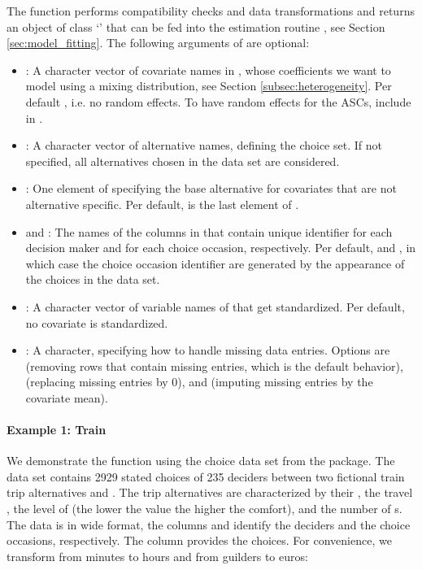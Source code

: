 \documentclass[article]{jss}
\newcommand{\class}[1]{`\code{#1}'}
\newcommand{\fct}[1]{\code{#1()}}
\begin{document}
The function performs compatibility checks and data transformations and returns an object of class \class{RprobitB\_data} that can be fed into the estimation routine \fct{fit\_model}, see Section \ref{sec:model_fitting}. The following arguments of \fct{prepare\_data} are optional:
\begin{itemize}
  \item {}: A character vector of covariate names in , whose coefficients we want to model using a mixing distribution, see Section \ref{subsec:heterogeneity}. Per default , i.e. no random effects. To have random effects for the ASCs, include  in .
  \item {}: A character vector of alternative names, defining the choice set. If not specified, all alternatives chosen in the data set are considered.
  \item {}: One element of  specifying the base alternative for covariates that are not alternative specific. Per default,  is the last element of .
  \item {} and : The names of the columns in  that contain unique identifier for each decision maker and for each choice occasion, respectively. Per default,  and , in which case the choice occasion identifier are generated by the appearance of the choices in the data set.
  \item {}: A character vector of variable names of  that get standardized. Per default, no covariate is standardized.
  \item {}: A character, specifying how to handle missing data entries. Options are  (removing rows that contain missing entries, which is the default behavior),  (replacing missing entries by 0), and  (imputing missing entries by the covariate mean).
\end{itemize}

\paragraph{Example 1: Train}

We demonstrate the \fct{prepare\_data} function using the choice data set  from the  package. The data set contains 2929 stated choices of 235 deciders between two fictional train trip alternatives  and . The trip alternatives are characterized by their , the travel , the level of  (the lower the value the higher the comfort), and the number of s. The data is in wide format, the columns  and  identify the deciders and the choice occasions, respectively. The column  provides the choices. For convenience, we transform  from minutes to hours and  from guilders to euros:
\end{document}
